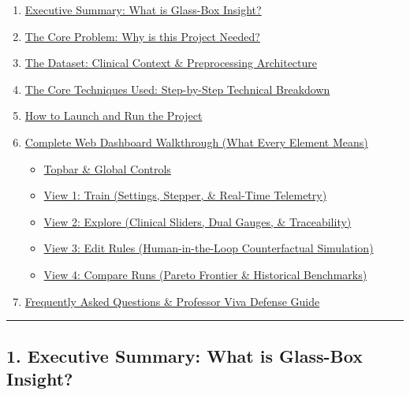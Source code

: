 \begin{enumerate}
\def\labelenumi{\arabic{enumi}.}
\tightlist
\item
  \hyperref[1-executive-summary-what-is-glass-box-insight]{Executive
  Summary: What is Glass-Box Insight?}
\item
  \hyperref[2-the-core-problem-why-is-this-project-needed]{The Core
  Problem: Why is this Project Needed?}
\item
  \hyperref[3-the-dataset-clinical-context--preprocessing-architecture]{The
  Dataset: Clinical Context \& Preprocessing Architecture}
\item
  \hyperref[4-the-core-techniques-used-step-by-step-technical-breakdown]{The
  Core Techniques Used: Step-by-Step Technical Breakdown}
\item
  \hyperref[5-how-to-launch-and-run-the-project]{How to Launch and Run
  the Project}
\item
  \hyperref[6-complete-web-dashboard-walkthrough-what-every-element-means]{Complete
  Web Dashboard Walkthrough (What Every Element Means)}

  \begin{itemize}
  \tightlist
  \item
    \hyperref[topbar--global-controls]{Topbar \& Global Controls}
  \item
    \hyperref[view-1-train-settings-stepper--real-time-telemetry]{View
    1: Train (Settings, Stepper, \& Real-Time Telemetry)}
  \item
    \hyperref[view-2-explore-clinical-sliders-dual-gauges--traceability]{View
    2: Explore (Clinical Sliders, Dual Gauges, \& Traceability)}
  \item
    \hyperref[view-3-edit-rules-human-in-the-loop-counterfactual-simulation]{View
    3: Edit Rules (Human-in-the-Loop Counterfactual Simulation)}
  \item
    \hyperref[view-4-compare-runs-pareto-frontier--historical-benchmarks]{View
    4: Compare Runs (Pareto Frontier \& Historical Benchmarks)}
  \end{itemize}
\item
  \hyperref[7-frequently-asked-questions--professor-viva-defense-guide]{Frequently
  Asked Questions \& Professor Viva Defense Guide}
\end{enumerate}

\begin{center}\rule{0.5\linewidth}{0.5pt}\end{center}

\subsection{1. Executive Summary: What is Glass-Box
Insight?}\label{executive-summary-what-is-glass-box-insight}

